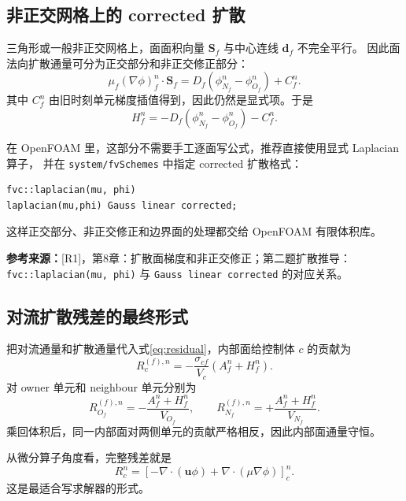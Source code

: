 \documentclass[UTF8,12pt,a4paper]{ctexart}
\numberwithin{equation}{section}
\newcommand{\Rone}{\textnormal{[R1]}}
\newcommand{\source}[1]{%
  \par\smallskip
  \noindent\colorbox{sourcebg}{%
    \parbox{0.955\linewidth}{\raggedright\footnotesize\color{sourcegray}\textbf{参考来源：}#1}%
  }
  \par\smallskip
}
\newcommand{\Sf}{\bm S}
\newcommand{\uf}{\bm u}
\begin{document}
\subsection{非正交网格上的 corrected 扩散}

三角形或一般非正交网格上，面面积向量 $\Sf_f$ 与中心连线 $\bm d_f$ 不完全平行。
因此面法向扩散通量可分为正交部分和非正交修正部分：
\begin{equation}
  \mu_f(\nabla\phi)^n_f\cdot\Sf_f
  =
  D_f(\phi_{N_f}^n-\phi_{O_f}^n)
  +
  C_f^n.
  \label{eq:corrected_laplacian}
\end{equation}
其中 $C_f^n$ 由旧时刻单元梯度插值得到，因此仍然是显式项。于是
\begin{equation}
  H_f^n
  =
  -D_f(\phi_{N_f}^n-\phi_{O_f}^n)
  -
  C_f^n.
  \label{eq:corrected_H}
\end{equation}

在 OpenFOAM 里，这部分不需要手工逐面写公式，推荐直接使用显式 Laplacian 算子，
并在 \texttt{system/fvSchemes} 中指定 corrected 扩散格式：
\begin{lstlisting}[style=solver]
fvc::laplacian(mu, phi)
laplacian(mu,phi) Gauss linear corrected;
\end{lstlisting}
这样正交部分、非正交修正和边界面的处理都交给 OpenFOAM 有限体积库。

\source{\Rone，第8章：扩散面梯度和非正交修正；第二题扩散推导：
\texttt{fvc::laplacian(mu, phi)} 与 \texttt{Gauss linear corrected} 的对应关系。}

\subsection{对流扩散残差的最终形式}

把对流通量和扩散通量代入式\eqref{eq:residual}，内部面给控制体 $c$ 的贡献为
\begin{equation}
  R_c^{(f),n}
  =
  -\frac{\sigma_{cf}}{V_c}
  \left(A_f^n+H_f^n\right).
  \label{eq:face_residual_contribution}
\end{equation}
对 owner 单元和 neighbour 单元分别为
\begin{equation}
  R_{O_f}^{(f),n}
  =
  -\frac{A_f^n+H_f^n}{V_{O_f}},
  \qquad
  R_{N_f}^{(f),n}
  =
  +\frac{A_f^n+H_f^n}{V_{N_f}}.
  \label{eq:owner_neighbour_assembly}
\end{equation}
乘回体积后，同一内部面对两侧单元的贡献严格相反，因此内部面通量守恒。

从微分算子角度看，完整残差就是
\begin{equation}
  \boxed{
  R_c^n
  =
  \left[
  -\nabla\cdot(\uf\phi)
  +
  \nabla\cdot(\mu\nabla\phi)
  \right]_c^n.}
  \label{eq:R_operator}
\end{equation}
这是最适合写求解器的形式。
\end{document}
